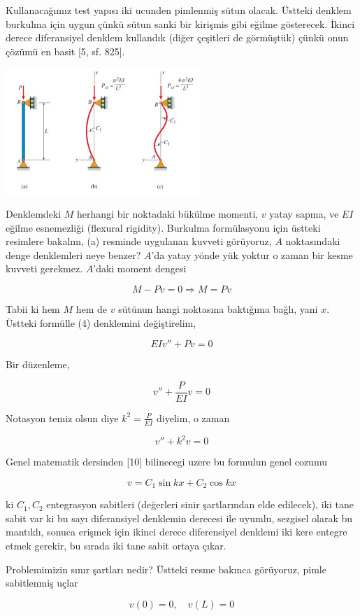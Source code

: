 \documentclass[12pt,fleqn]{article}\usepackage{../../common}
\begin{document}
Kullanacağımız test yapısı iki ucunden pimlenmiş sütun olacak. Üstteki denklem
burkulma için uygun çünkü sütun sanki bir kirişmis gibi eğilme gösterecek.
İkinci derece diferansiyel denklem kullandık (diğer çeşitleri de görmüştük)
çünkü onun çözümü en basit [5, sf. 825].

\includegraphics[width=20em]{phy_020_strs_06_03.jpg}

Denklemdeki $M$ herhangi bir noktadaki bükülme momenti, $v$ yatay sapma, ve $EI$
eğilme esnemezliği (flexural rigidity). Burkulma formülasyonu için üstteki
resimlere bakalım, (a) resminde uygulanan kuvveti görüyoruz, $A$ noktasındaki
denge denklemleri neye benzer? $A$'da yatay yönde yük yoktur o zaman bir kesme
kuvveti gerekmez. $A$'daki moment dengesi

$$
M - Pv = 0 \Rightarrow M = Pv
$$

Tabii ki hem $M$ hem de $v$ sütünun hangi noktasına baktığıma bağlı, yani $x$.
Üstteki formülle (4) denklemini değiştirelim,

$$
EI v'' + Pv = 0
$$

Bir düzenleme, 

$$
v'' + \frac{P}{EI} v = 0
$$

Notasyon temiz olsun diye $k^2 = \frac{P}{EI}$ diyelim, o zaman 

$$
v'' + k^2 v = 0
$$

Genel matematik dersinden [10] bilinecegi uzere bu formulun genel cozumu

$$
v = C_1 \sin kx + C_2 \cos kx
$$

ki $C_1,C_2$ entegrasyon sabitleri (değerleri sinir şartlarından elde edilecek),
iki tane sabit var ki bu sayı diferansiyel denklemin derecesi ile uyumlu,
sezgisel olarak bu mantıklı, sonuca erişmek için ikinci derece diferensiyel
denklemi iki kere entegre etmek gerekir, bu sırada iki tane sabit ortaya çıkar.

Problemimizin sınır şartları nedir? Üstteki resme bakınca görüyoruz, pimle
sabitlenmiş uçlar

$$
v(0) = 0, \quad v(L) = 0
$$
\end{document}
